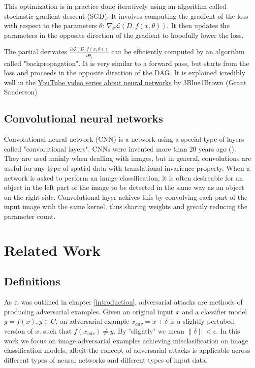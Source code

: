 This optimization is in practice done iteratively using an algorithm called stochastic gradient descent (SGD). It involves computing the gradient of the loss with respect to the parameters $\theta$: $\nabla_{\theta} \mathcal{L}(D, f(x, \theta))$. It then updates the parameters in the opposite direction of the gradient to hopefully lower the loss.

The partial derivates $\frac{\partial \mathcal{L}(D, f(x, \theta))}{\partial \theta_i}$ can be efficiently computed by an algorithm called "backpropagation". It is very similar to a forward pass, but starts from the loss and proceeds in the opposite direction of the DAG. It is explained icredibly well in the \href{https://www.youtube.com/playlist?list=PLZHQObOWTQDNU6R1_67000Dx_ZCJB-3pi}{YouTube video series about neural networks} by 3Blue1Brown (Grant Sanderson)

\subsection{Convolutional neural networks}
Convolutional neural network (CNN) is a network using a special type of layers called "convolutional layers". CNNs were invented more than 20 years ago (\cite{LeCun1998ConvolutionalNF}). They are used mainly when dealling with images, but in general, convolutions are useful for any type of spatial data with translational invarience property. When a network is asked to perform an image classification, it is often desireable for an object in the left part of the image to be detected in the same way as an object on the right side. Convolutional layer achives this by convolving each part of the input image with the same kernel, thus sharing weights and greatly reducing the parameter count.


\section{Related Work}
\label{related_work}

\subsection{Definitions}
As it was outlined in chapter \ref{introduction}, adversarial attacks are methods of producing adversarial examples. Given an original input $x$ and a classifier model $y = f(x), y \in C$, an adversarial example $x_{adv} = x + \delta$ is a slightly pertubed version of $x$, such that $f(x_{adv}) \neq y$. By "slightly" we mean $\lVert \delta \rVert < \epsilon$. In this work we focus on image adversarial examples achieving misclasification on image classification models, albeit the concept of adversarial attacks is applicable across different types of neural networks and different types of input data.

